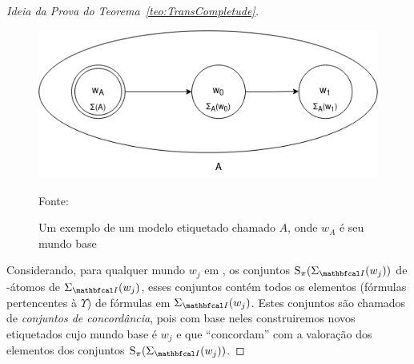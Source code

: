 \begin{proof}[Ideia da Prova do Teorema~\ref{teo:TransCompletude}]
                \begin{figure}[htbp]
                    \centering
                    \includegraphics[scale=.5]{Figuras/Modelo.png}
                    \caption[Modelo Etiquetado]{Um exemplo de um modelo etiquetado chamado \(A\), onde \(w_A\) é seu mundo base}
                    \small{Fonte: \me}
                    \label{fig:ModeloEtiquetado}
                \end{figure}

                Considerando, para qualquer mundo \(w_j\) em \Modeloinicial, os conjuntos \(\funcao{S}_{\pi}(\Sigma_{\modeloinicial}(w_j))\)
                de \PI-átomos de \(\Sigma_{\modeloinicial}(w_j)\), esses conjuntos contém todos os elementos (fórmulas pertencentes à \(\Upsilon\)) de fórmulas em \(\Sigma_{\modeloinicial}(w_j)\).
                Estes conjuntos são chamados de \textit{conjuntos de concordância}, pois com base neles construiremos novos \OPImodelos etiquetados
                 cujo mundo base é \(w_j\) e que ``concordam'' com a valoração dos elementos dos conjuntos \(\funcao{S}_{\pi}(\Sigma_{\modeloinicial}(w_j))\).


\end{proof}
